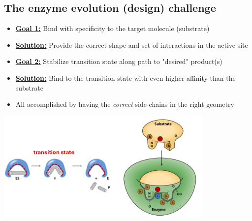 \documentclass[10pt]{article}
\begin{document}
\subsection*{The enzyme evolution (design) challenge}
\begin{itemize}
    \item \textbf{\underline{Goal 1:}} Bind with specificity to the target molecule (substrate)
    \item \textbf{\underline{Solution:}} Provide the correct shape and set of interactions in the active site
    \item \textbf{\underline{Goal 2:}} Stabilize transition state along path to "desired" product(s)
    \item \textbf{\underline{Solution:}} Bind to the transition state with even higher affinity than the substrate
    \item All accomplished by having the \textit{correct} side-chains in the right geometry
\end{itemize}
\begin{center}
    \includegraphics*[width=0.8\textwidth]{L1_6.png}
\end{center}
\end{document}
